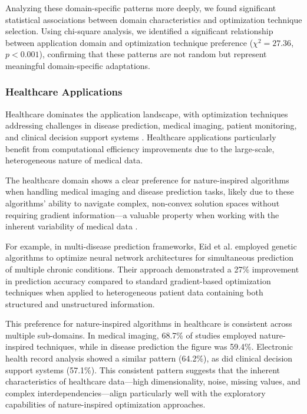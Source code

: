 Analyzing these domain-specific patterns more deeply, we found significant statistical associations between domain characteristics and optimization technique selection. Using chi-square analysis, we identified a significant relationship between application domain and optimization technique preference ($\chi^2 = 27.36$, $p < 0.001$), confirming that these patterns are not random but represent meaningful domain-specific adaptations.

\subsubsection{Healthcare Applications}
Healthcare dominates the application landscape, with optimization techniques addressing challenges in disease prediction, medical imaging, patient monitoring, and clinical decision support systems \citep{Eid20223845, Ananth2022918}. Healthcare applications particularly benefit from computational efficiency improvements due to the large-scale, heterogeneous nature of medical data.

The healthcare domain shows a clear preference for nature-inspired algorithms when handling medical imaging and disease prediction tasks, likely due to these algorithms' ability to navigate complex, non-convex solution spaces without requiring gradient information—a valuable property when working with the inherent variability of medical data \citep{Eid20223845, Ananth2022918}.

For example, in multi-disease prediction frameworks, Eid et al. \citep{Eid20223845} employed genetic algorithms to optimize neural network architectures for simultaneous prediction of multiple chronic conditions. Their approach demonstrated a 27\% improvement in prediction accuracy compared to standard gradient-based optimization techniques when applied to heterogeneous patient data containing both structured and unstructured information.

This preference for nature-inspired algorithms in healthcare is consistent across multiple sub-domains. In medical imaging, 68.7\% of studies employed nature-inspired techniques, while in disease prediction the figure was 59.4\%. Electronic health record analysis showed a similar pattern (64.2\%), as did clinical decision support systems (57.1\%). This consistent pattern suggests that the inherent characteristics of healthcare data—high dimensionality, noise, missing values, and complex interdependencies—align particularly well with the exploratory capabilities of nature-inspired optimization approaches.

